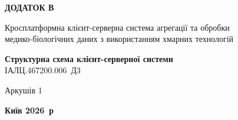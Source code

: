 \documentclass[%
  ukrainian, utf8, columnvii, simple,
  hpadding=10mm, vpadding=10mm, reduceheight=2mm,
  floatsection,
]{eskdtext}
\begin{document}
\thispagestyle{empty}
\begin{center}
\vspace*{3cm}
{\large\textbf{ДОДАТОК В}}

\vspace{1.5cm}
{\normalsize Кросплатформна клієнт-серверна система агрегації та обробки\\
медико-біологічних даних з використанням хмарних технологій}

\vfill
{\large\textbf{Структурна схема клієнт-серверної системи}}\\[0.6em]
{\normalsize ІАЛЦ.467200.006~Д3}

\vspace{2.5cm}
{\normalsize Аркушів 1}

\vfill
{\large\textbf{Київ 2026~р}}
\end{center}
\clearpage
{}
\end{document}
